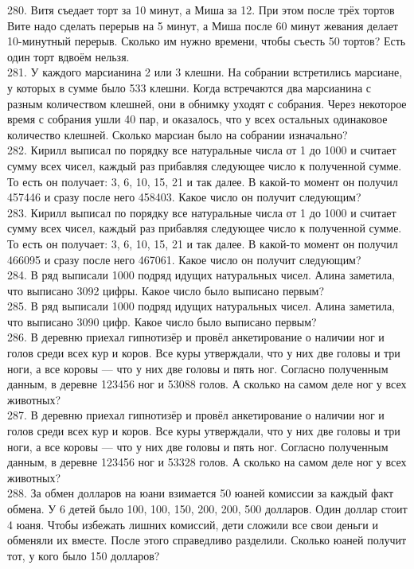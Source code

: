 \documentclass[12pt]{article}
\begin{document}
280. Витя съедает торт за 10 минут, а Миша за 12. При этом после трёх тортов Вите надо сделать перерыв на 5 минут, а Миша после 60 минут жевания делает 10-минутный перерыв. Сколько им нужно времени, чтобы съесть 50 тортов? Есть один торт вдвоём нельзя.\\
281. У каждого марсианина 2 или 3 клешни. На собрании встретились марсиане, у которых в сумме было 533 клешни. Когда встречаются два марсианина с разным количеством клешней, они в обнимку уходят с собрания. Через некоторое время с собрания ушли 40 пар, и оказалось, что у всех остальных одинаковое количество клешней. Сколько марсиан было на собрании изначально?\\
282. Кирилл выписал по порядку все натуральные числа от 1 до 1000 и считает сумму всех чисел, каждый раз прибавляя следующее число к полученной сумме. То есть он получает: 3, 6, 10, 15, 21 и так далее. В какой-то момент он получил 457446 и сразу после него 458403. Какое число он получит следующим?\\
283. Кирилл выписал по порядку все натуральные числа от 1 до 1000 и считает сумму всех чисел, каждый раз прибавляя следующее число к полученной сумме. То есть он получает: 3, 6, 10, 15, 21 и так далее. В какой-то момент он получил 466095 и сразу после него 467061. Какое число он получит следующим?\\
284. В ряд выписали 1000 подряд идущих натуральных чисел. Алина заметила, что выписано 3092 цифры. Какое число было выписано первым?\\
285. В ряд выписали 1000 подряд идущих натуральных чисел. Алина заметила, что выписано 3090 цифр. Какое число было выписано первым?\\
286. В деревню приехал гипнотизёр и провёл анкетирование о наличии ног и голов среди всех кур и коров. Все куры утверждали, что у них две головы и три ноги, а все коровы --- что у них две головы и пять ног. Согласно полученным данным, в деревне 123456 ног и 53088 голов. А сколько на самом деле ног у всех животных?\\
287. В деревню приехал гипнотизёр и провёл анкетирование о наличии ног и голов среди всех кур и коров. Все куры утверждали, что у них две головы и три ноги, а все коровы --- что у них две головы и пять ног. Согласно полученным данным, в деревне 123456 ног и 53328 голов. А сколько на самом деле ног у всех животных?\\
288. За обмен долларов на юани взимается 50 юаней комиссии за каждый факт обмена. У 6 детей было 100, 100, 150, 200, 200, 500 долларов. Один доллар стоит 4 юаня. Чтобы избежать лишних комиссий, дети сложили все свои деньги и обменяли их вместе. После этого справедливо разделили. Сколько юаней получит тот, у кого было 150 долларов?\\
\end{document}
